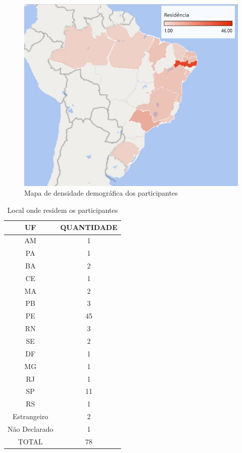 \begin{figure}[H]
    \centering
    \includegraphics[width=12cm]{images/residencia.jpg}
    \caption{Mapa de densidade demográfica dos participantes}
    \label{fig:residencia}
\end{figure}


\begin{table}[H]
\centering
\caption{Local onde residem os participantes}
\label{tab:residencias}
\begin{tabular}{|c|c|}
\hline
UF            & QUANTIDADE \\ \hline
\rowcolor[HTML]{FFCCC9} 
AM            & 1             \\ \hline
\rowcolor[HTML]{FFCCC9} 
PA            & 1             \\ \hline
\rowcolor[HTML]{FFFC9E} 
BA            & 2             \\ \hline
\rowcolor[HTML]{FFFC9E} 
CE            & 1             \\ \hline
\rowcolor[HTML]{FFFC9E} 
MA            & 2             \\ \hline
\rowcolor[HTML]{FFFC9E} 
PB            & 3             \\ \hline
\rowcolor[HTML]{FFFC9E} 
PE            & 45            \\ \hline
\rowcolor[HTML]{FFFC9E} 
RN            & 3             \\ \hline
\rowcolor[HTML]{FFFC9E} 
SE            & 2             \\ \hline
\rowcolor[HTML]{9AFF99} 
DF            & 1             \\ \hline
\rowcolor[HTML]{CBCEFB} 
MG            & 1             \\ \hline
\rowcolor[HTML]{CBCEFB} 
RJ            & 1             \\ \hline
\rowcolor[HTML]{CBCEFB} 
SP            & 11            \\ \hline
\rowcolor[HTML]{34CDF9} 
RS            & 1             \\ \hline
\rowcolor[HTML]{C0C0C0} 
Estrangeiro   & 2             \\ \hline
Não Declarado & 1             \\ \hline
TOTAL         & 78            \\ \hline
\end{tabular}
\end{table}
